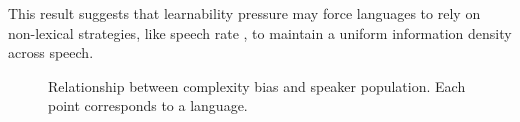\documentclass{evolang11}
\begin{document}
This result suggests that learnability pressure may force languages to rely on non-lexical strategies, like speech rate \cite{pellegrino2011across}, to maintain a uniform information density across speech.


\begin{figure}[ht]
\begin{center}
\end{center}
\caption{Relationship between complexity bias and speaker population. Each point corresponds to a language. \label{fig2}}
\end{figure}







 
\end{document}
